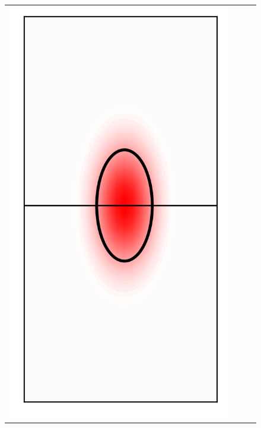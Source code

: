 \documentclass[10pt,final,xcolor=dvipsnames]{beamer}
\begin{document}
\begin{frame}
\begin{figure}
{\begin{tabular}{cccc}
	    \includegraphics[scale=0.2]{localpsf_revised_figures/ricker_ellipsoid_a=0.23.png} & 

\end{tabular}}
\end{figure}
\end{frame}
\end{document}
